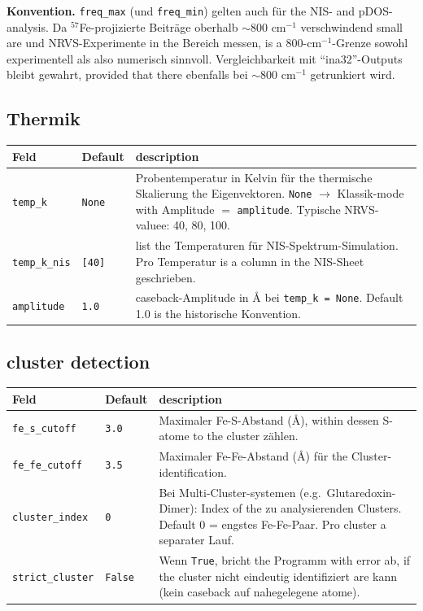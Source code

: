 \documentclass[11pt,a4paper,twoside]{article}
\theoremstyle{remark}
\begin{document}
\begin{infobox}
\textbf{Konvention.} \texttt{freq\_max} (und \texttt{freq\_min}) gelten
auch f\"ur the NIS- and pDOS-analysis. Da $^{57}$Fe-projizierte
Beitr\"age oberhalb $\sim$800 cm$^{-1}$ verschwindend small are und
NRVS-Experimente in the Bereich messen, is a 800-cm$^{-1}$-Grenze
sowohl experimentell als also numerisch sinnvoll. Vergleichbarkeit mit
``ina32''-Outputs bleibt gewahrt, provided that there ebenfalls bei $\sim$800
cm$^{-1}$ getrunkiert wird.
\end{infobox}

\subsection{Thermik}

\begin{longtable}{p{} p{} p{}}
\toprule
\textbf{Feld} & \textbf{Default} & \textbf{description} \\
\midrule
\endhead
\texttt{temp\_k}       & \texttt{None} & Probentemperatur in Kelvin
  f\"ur the thermische Skalierung the Eigenvektoren. \texttt{None}
  $\to$ Klassik-mode with Amplitude $=$ \texttt{amplitude}. Typische
  NRVS-valuee: 40, 80, 100. \\
\texttt{temp\_k\_nis}  & \texttt{[40]} & list the Temperaturen f\"ur
  NIS-Spektrum-Simulation. Pro Temperatur is a column in the NIS-Sheet
  geschrieben. \\
\texttt{amplitude}      & \texttt{1.0}  & caseback-Amplitude in
  \AA{} bei \texttt{temp\_k = None}. Default 1.0 is the historische
  Konvention. \\
\bottomrule
\end{longtable}

\subsection{cluster detection}

\begin{longtable}{p{} p{} p{}}
\toprule
\textbf{Feld} & \textbf{Default} & \textbf{description} \\
\midrule
\endhead
\texttt{fe\_s\_cutoff}  & \texttt{3.0} & Maximaler Fe-S-Abstand (\AA{}),
  within dessen S-atome to the cluster z\"ahlen. \\
\texttt{fe\_fe\_cutoff} & \texttt{3.5} & Maximaler Fe-Fe-Abstand (\AA{})
  f\"ur the Cluster-identification. \\
\texttt{cluster\_index} & \texttt{0}   & Bei Multi-Cluster-systemen
  (e.g.\ Glutaredoxin-Dimer): Index of the zu analysierenden Clusters.
  Default 0 = engstes Fe-Fe-Paar. Pro cluster a separater Lauf. \\
\texttt{strict\_cluster} & \texttt{False} & Wenn \texttt{True},
  bricht the Programm with error ab, if the cluster nicht
  eindeutig identifiziert are kann (kein caseback auf nahegelegene
  atome). \\
\bottomrule
\end{longtable}
\end{document}
